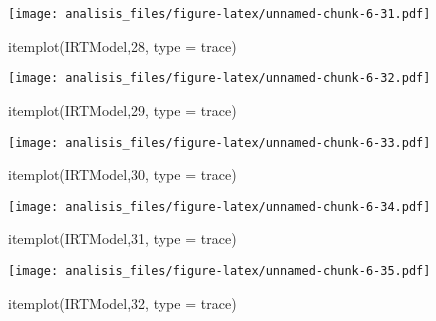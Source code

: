 \documentclass[
]{article}
\newenvironment{Shaded}{\begin{snugshade}}{\end{snugshade}}
\newcommand{\AttributeTok}[1]{\textcolor[rgb]{0.77,0.63,0.00}{#1}}
\newcommand{\DecValTok}[1]{\textcolor[rgb]{0.00,0.00,0.81}{#1}}
\newcommand{\FunctionTok}[1]{\textcolor[rgb]{0.00,0.00,0.00}{#1}}
\newcommand{\NormalTok}[1]{#1}
\newcommand{\StringTok}[1]{\textcolor[rgb]{0.31,0.60,0.02}{#1}}
\begin{document}
\texttt{[image: analisis\_files/figure-latex/unnamed-chunk-6-31.pdf]}

\begin{Shaded}
\begin{Highlighting}[]
\FunctionTok{itemplot}\NormalTok{(IRTModel,}\DecValTok{28}\NormalTok{, }\AttributeTok{type =} \StringTok{\textquotesingle{}trace\textquotesingle{}}\NormalTok{)}
\end{Highlighting}
\end{Shaded}

\texttt{[image: analisis\_files/figure-latex/unnamed-chunk-6-32.pdf]}

\begin{Shaded}
\begin{Highlighting}[]
\FunctionTok{itemplot}\NormalTok{(IRTModel,}\DecValTok{29}\NormalTok{, }\AttributeTok{type =} \StringTok{\textquotesingle{}trace\textquotesingle{}}\NormalTok{)}
\end{Highlighting}
\end{Shaded}

\texttt{[image: analisis\_files/figure-latex/unnamed-chunk-6-33.pdf]}

\begin{Shaded}
\begin{Highlighting}[]
\FunctionTok{itemplot}\NormalTok{(IRTModel,}\DecValTok{30}\NormalTok{, }\AttributeTok{type =} \StringTok{\textquotesingle{}trace\textquotesingle{}}\NormalTok{)}
\end{Highlighting}
\end{Shaded}

\texttt{[image: analisis\_files/figure-latex/unnamed-chunk-6-34.pdf]}

\begin{Shaded}
\begin{Highlighting}[]
\FunctionTok{itemplot}\NormalTok{(IRTModel,}\DecValTok{31}\NormalTok{, }\AttributeTok{type =} \StringTok{\textquotesingle{}trace\textquotesingle{}}\NormalTok{)}
\end{Highlighting}
\end{Shaded}

\texttt{[image: analisis\_files/figure-latex/unnamed-chunk-6-35.pdf]}

\begin{Shaded}
\begin{Highlighting}[]
\FunctionTok{itemplot}\NormalTok{(IRTModel,}\DecValTok{32}\NormalTok{, }\AttributeTok{type =} \StringTok{\textquotesingle{}trace\textquotesingle{}}\NormalTok{)}
\end{Highlighting}
\end{Shaded}
\end{document}
